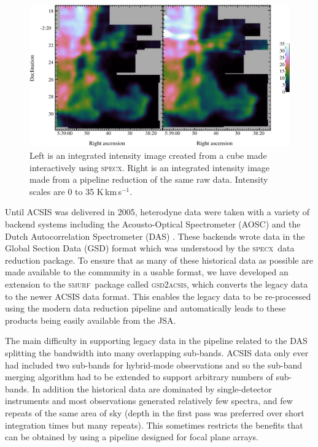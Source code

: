 \documentclass[useAMS,usenatbib]{mn2e}
\newcommand{\specx}{\textsc{specx}}
\newcommand{\smurf}{\textsc{smurf}}
\newcommand{\gsdacsis}{\textsc{gsd{\footnotesize{2}}acsis}}
\begin{document}
\begin{figure}
\centering
\includegraphics[width=\textwidth]{horsehead}
\caption{Left is an integrated intensity image created from
  a cube made interactively using \specx. Right is an
  integrated intensity image made from a pipeline reduction of the
  same raw data. Intensity scales are 0 to 35 K\,km\,s$^{-1}$.}
\label{fig:hhcmp}
\end{figure}

Until ACSIS was delivered in 2005, heterodyne data were taken with a
variety of backend systems including the Acousto-Optical Spectrometer
(AOSC) and the Dutch Autocorrelation Spectrometer (DAS)
\citep{1986SPIE..598..134B}. These backends wrote data in the
Global Section Data (GSD) format \citep[e.g.,][]{GSD1999} which was
understood by the \specx\ data reduction package. To ensure that as many
of these historical data as possible are made available to the community
in a usable format, we have developed an extension to the \smurf\
package called \gsdacsis, which converts the legacy data to the
newer ACSIS data format. This enables the legacy data to be re-processed using
the modern data reduction pipeline and automatically leads to these
products being easily available from the JSA.

The main difficulty in supporting legacy data in the pipeline related
to the DAS splitting the bandwidth into many overlapping
sub-bands. ACSIS data only ever had included two sub-bands for hybrid-mode
observations and so the sub-band merging algorithm had to be
extended to support arbitrary numbers of sub-bands.  In addition the
historical data are dominated by single-detector instruments and most
observations generated relatively few spectra, and few repeats of the
same area of sky (depth in the first pass was preferred over short
integration times but many repeats). This sometimes
restricts the benefits that can be obtained by using a pipeline
designed for focal plane arrays.
\end{document}
